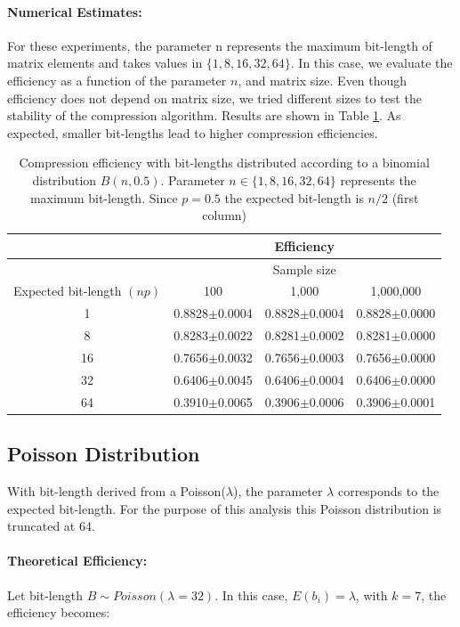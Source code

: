 \documentclass[10pt]{article}
\begin{document}
\paragraph{Numerical Estimates:}
For these experiments, the parameter n represents the maximum bit-length of matrix elements and takes values in $\{1, 8, 16, 32, 64\}$. In this case, we evaluate the efficiency as a function of the parameter $n$, and matrix size. Even though efficiency does not depend on matrix size, we tried different sizes to test the stability of the compression algorithm. Results are shown in Table \ref{tab:04}. As expected, smaller bit-lengths lead to higher compression efficiencies.


\begin{table}[h]
  \centering
  \caption{Compression efficiency with bit-lengths distributed according to a binomial distribution $B(n,0.5)$. Parameter $n \in \{1, 8, 16, 32, 64 \} $ represents the maximum bit-length. Since $p=0.5$ the expected bit-length is $n/2$ (first column)}
   \begin{tabular}{cccc}
     \hline
     & &Efficiency& \\
     \hline
     & &Sample size& \\
     Expected bit-length $(np)$ &100 &1,000 &1,000,000 \\
     \hline
     1 &0.8828$\pm$0.0004&0.8828$\pm$0.0004&0.8828$\pm$0.0000\\ 
     8 &0.8283$\pm$0.0022&0.8281$\pm$0.0002&0.8281$\pm$0.0000\\ 
     16&0.7656$\pm$0.0032&0.7656$\pm$0.0003&0.7656$\pm$0.0000\\ 
     32&0.6406$\pm$0.0045&0.6406$\pm$0.0004&0.6406$\pm$0.0000\\ 
     64&0.3910$\pm$0.0065&0.3906$\pm$0.0006&0.3906$\pm$0.0001\\
     \hline
  \end{tabular}
  \label{tab:04}
\end{table}

\subsection*{Poisson Distribution}
With bit-length derived from a Poisson($\lambda$), the parameter $\lambda$ corresponds to the expected bit-length. For the purpose of this analysis this Poisson distribution is truncated at 64. 
\paragraph{Theoretical Efficiency:}
Let bit-length $B \sim Poisson(\lambda=32)$. In this case, $E(b_i) = \lambda$, with $k=7$,  the efficiency becomes:
\end{document}
